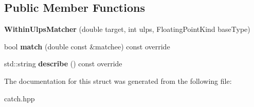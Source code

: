 \subsection*{Public Member Functions}
\begin{DoxyCompactItemize}
\item 
{\bfseries Within\+Ulps\+Matcher} (double target, int ulps, Floating\+Point\+Kind base\+Type)\hypertarget{structCatch_1_1Matchers_1_1Floating_1_1WithinUlpsMatcher_a836074ae4010275284ab66b2485c6575}{}\label{structCatch_1_1Matchers_1_1Floating_1_1WithinUlpsMatcher_a836074ae4010275284ab66b2485c6575}

\item 
bool {\bfseries match} (double const \&matchee) const override\hypertarget{structCatch_1_1Matchers_1_1Floating_1_1WithinUlpsMatcher_aabda42a0dc5d00f3c5916feb75006b32}{}\label{structCatch_1_1Matchers_1_1Floating_1_1WithinUlpsMatcher_aabda42a0dc5d00f3c5916feb75006b32}

\item 
std\+::string {\bfseries describe} () const override\hypertarget{structCatch_1_1Matchers_1_1Floating_1_1WithinUlpsMatcher_ad9bc8bb7f3abd326580a4bf6cf369b1b}{}\label{structCatch_1_1Matchers_1_1Floating_1_1WithinUlpsMatcher_ad9bc8bb7f3abd326580a4bf6cf369b1b}

\end{DoxyCompactItemize}


The documentation for this struct was generated from the following file\+:\begin{DoxyCompactItemize}
\item 
catch.\+hpp\end{DoxyCompactItemize}
